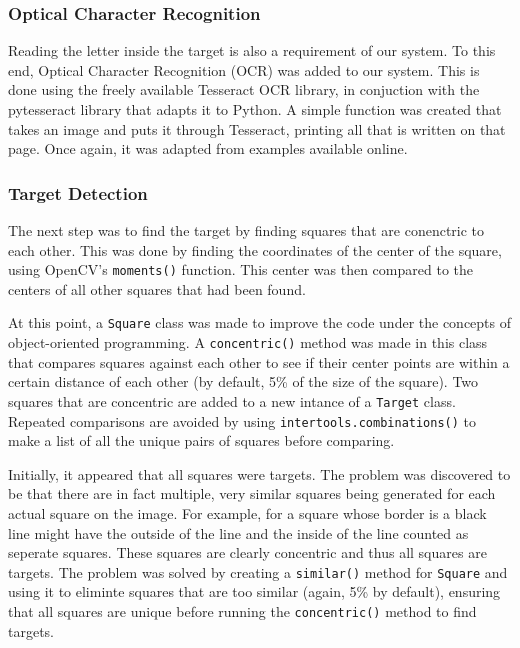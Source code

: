 \documentclass[11pt]{article}
\begin{document}
\subsubsection{Optical Character Recognition}
Reading the letter inside the target is also a requirement of our system. To this end, Optical Character Recognition (OCR) was added to our system. This is done using the freely available Tesseract OCR library, in conjuction with the pytesseract library that adapts it to Python. A simple function was created that takes an image and puts it through Tesseract, printing all that is written on that page. Once again, it was adapted from examples available online.\cite{pyimagesearch_ocr}

\subsubsection{Target Detection}
The next step was to find the target by finding squares that are conenctric to each other. This was done by finding the coordinates of the center of the square, using OpenCV's \lstinline|moments()| function. This center was then compared to the centers of all other squares that had been found.

At this point, a \lstinline|Square| class was made to improve the code under the concepts of object-oriented programming. A \lstinline|concentric()| method was made in this class that compares squares against each other to see if their center points are within a certain distance of each other (by default, 5\% of the size of the square). Two squares that are concentric are added to a new intance of a \lstinline|Target| class. Repeated comparisons are avoided by using \lstinline|intertools.combinations()| to make a list of all the unique pairs of squares before comparing.

Initially, it appeared that all squares were targets. The problem was discovered to be that there are in fact multiple, very similar squares being generated for each actual square on the image. For example, for a square whose border is a black line might have the outside of the line and the inside of the line counted as seperate squares. These squares are clearly concentric and thus all squares are targets. The problem was solved by creating a \lstinline|similar()| method for \lstinline|Square| and using it to eliminte squares that are too similar (again, 5\% by default), ensuring that all squares are unique before running the \lstinline|concentric()| method to find targets.
\end{document}
